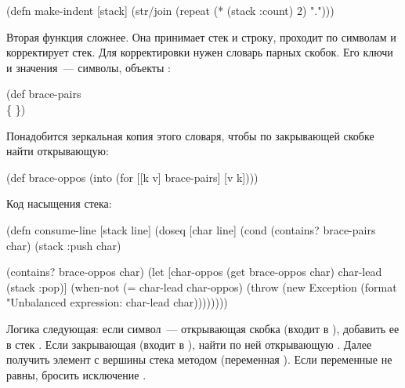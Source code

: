 \begin{english}
  \begin{clojure}
(defn make-indent [stack]
  (str/join (repeat (* (stack :count) 2) ".")))
  \end{clojure}
\end{english}


Вторая функция  сложнее. Она принимает стек и строку, проходит по символам и корректирует стек. Для корректировки нужен словарь парных скобок. Его ключи и значения~--- символы, объекты :

\begin{english}
  \begin{clojure}
(def brace-pairs
  {\( \)
   \[ \]
   \{ \}})
  \end{clojure}
\end{english}

Понадобится зеркальная копия этого словаря, чтобы по закрывающей скобке найти открывающую:

\begin{english}
  \begin{clojure}
(def brace-oppos
  (into {} (for [[k v] brace-pairs]
             [v k])))
  \end{clojure}
\end{english}

Код насыщения стека:

\begin{english}
  \begin{clojure/lines}
(defn consume-line [stack line]
  (doseq [char line]
    (cond
      (contains? brace-pairs char)
      (stack :push char)

      (contains? brace-oppos char)
      (let [char-oppos
            (get brace-oppos char)
            char-lead
            (stack :pop)]
        (when-not (= char-lead char-oppos)
          (throw
           (new Exception
                (format "Unbalanced expression: %
                        char-lead char))))))))
  \end{clojure/lines}
\end{english}

Логика следующая: если символ~--- открывающая скобка (входит в ), добавить ее в стек . Если закрывающая (входит в ), найти по ней открывающую . Далее получить элемент с вершины стека методом  (переменная ). Если переменные не равны, бросить исключение .

